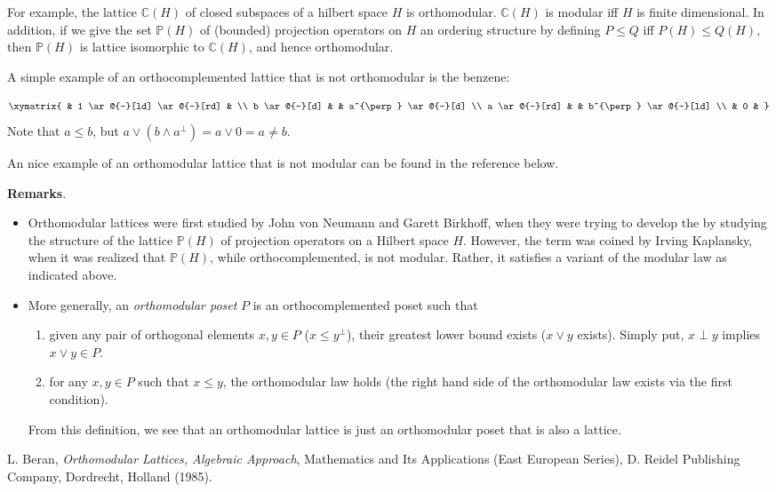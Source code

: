\documentclass[12pt]{article}
\begin{document}
For example, the lattice $\mathbb{C}(H)$ of closed subspaces of a hilbert space $H$ is orthomodular.  $\mathbb{C}(H)$ is modular iff $H$ is finite dimensional.  In addition, if we give the set $\mathbb{P}(H)$ of (bounded) projection operators on $H$ an ordering structure by defining $P\le Q$ iff $P(H)\le Q(H)$, then $\mathbb{P}(H)$ is lattice isomorphic to $\mathbb{C}(H)$, and hence orthomodular.

A simple example of an orthocomplemented lattice that is not orthomodular is the benzene:

\begin{equation*}
\xymatrix {
& 1 \ar@{-}[ld] \ar@{-}[rd] & \\
b \ar@{-}[d] & & a^{\perp} \ar@{-}[d] \\
a \ar@{-}[rd] & & b^{\perp} \ar@{-}[ld] \\
& 0 & }
\end{equation*}
Note that $a\le b$, but $a\vee (b\wedge a^{\perp})=a\vee 0=a\ne b$.

An nice example of an orthomodular lattice that is not modular can be found in the reference below.

\textbf{Remarks}.  
\begin{itemize}
\item Orthomodular lattices were first studied by John von Neumann and Garett Birkhoff, when they were trying to develop the  by studying the structure of the lattice $\mathbb{P}(H)$ of projection operators on a Hilbert space $H$.  However, the term was coined by Irving Kaplansky, when it was realized that $\mathbb{P}(H)$, while orthocomplemented, is not modular.  Rather, it satisfies a variant of the modular law as indicated above.
\item More generally, an \emph{orthomodular poset} $P$ is an orthocomplemented poset such that
\begin{enumerate}
\item given any pair of orthogonal elements $x,y\in P$ ($x\le y^{\perp}$), their greatest lower bound exists ($x\vee y$ exists).  Simply put, $x\perp y$ implies $x\vee y\in P$.
\item for any $x,y\in P$ such that $x\le y$, the orthomodular law holds (the right hand side of the orthomodular law exists via the first condition).
\end{enumerate}
From this definition, we see that an orthomodular lattice is just an orthomodular poset that is also a lattice.
\end{itemize}

\begin{thebibliography}{8}
 L. Beran, {\em Orthomodular Lattices, Algebraic Approach}, Mathematics and Its Applications (East European Series), D. Reidel Publishing Company, Dordrecht, Holland (1985).
\end{thebibliography}
\end{document}
